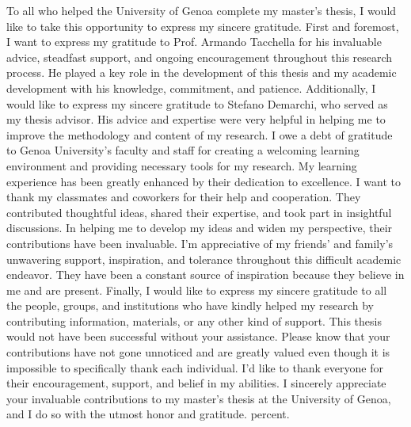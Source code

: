 
\begin{acknowledgements}      

    To all who helped the University of Genoa complete my master's thesis, I would like to take this opportunity to express my sincere gratitude.
    First and foremost, I want to express my gratitude to Prof. Armando Tacchella for his invaluable advice, steadfast support, and ongoing encouragement throughout this research process. He played a key role in the development of this thesis and my academic development with his knowledge, commitment, and patience. 
    Additionally, I would like to express my sincere gratitude to Stefano Demarchi, who served as my thesis advisor. His advice and expertise were very helpful in helping me to improve the methodology and content of my research. 
    I owe a debt of gratitude to Genoa University's faculty and staff for creating a welcoming learning environment and providing necessary tools for my research. My learning experience has been greatly enhanced by their dedication to excellence. 
    I want to thank my classmates and coworkers for their help and cooperation. They contributed thoughtful ideas, shared their expertise, and took part in insightful discussions. In helping me to develop my ideas and widen my perspective, their contributions have been invaluable. 
    I'm appreciative of my friends' and family's unwavering support, inspiration, and tolerance throughout this difficult academic endeavor. They have been a constant source of inspiration because they believe in me and are present. 
    Finally, I would like to express my sincere gratitude to all the people, groups, and institutions who have kindly helped my research by contributing information, materials, or any other kind of support. This thesis would not have been successful without your assistance. 
    Please know that your contributions have not gone unnoticed and are greatly valued even though it is impossible to specifically thank each individual. 
    I'd like to thank everyone for their encouragement, support, and belief in my abilities. I sincerely appreciate your invaluable contributions to my master's thesis at the University of Genoa, and I do so with the utmost honor and gratitude. 
    percent. 
\end{acknowledgements}

